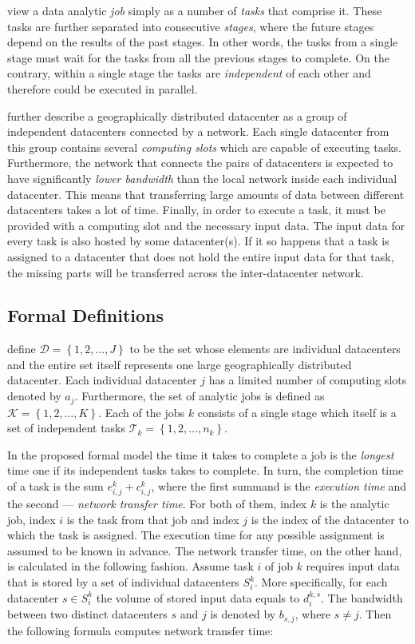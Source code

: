 \citet*{Chen2017} view a data analytic \emph{job} simply as a number of \emph{tasks} that comprise it. These tasks are further separated into consecutive \emph{stages}, where the future stages depend on the results of the past stages. In other words, the tasks from a single stage must wait for the tasks from all the previous stages to complete. On the contrary, within a single stage the tasks are \emph{independent} of each other and therefore could be executed in parallel.

\citet{Chen2017} further describe a geographically distributed datacenter as a group of independent datacenters connected by a network. Each single datacenter from this group contains several \emph{computing slots} which are capable of executing tasks. Furthermore, the network that connects the pairs of datacenters is expected to have significantly \emph{lower bandwidth} than the local network inside each individual datacenter. This means that transferring large amounts of data between different datacenters takes a lot of time. Finally, in order to execute a task, it must be provided with a computing slot and the necessary input data. The input data for every task is also hosted by some datacenter(s). If it so happens that a task is assigned to a datacenter that does not hold the entire input data for that task, the missing parts will be transferred across the inter-datacenter network.

\subsection{Formal Definitions}

\citet*{Chen2017} define \(\mathcal{D} = \left\{1, 2, \dots, J\right\}\) to be the set whose elements are individual datacenters and the entire set itself represents one large geographically distributed datacenter. Each individual datacenter \(j\) has a limited number of computing slots denoted by \(a_j\). Furthermore, the set of analytic jobs is defined as \(\mathcal{K} = \left\{1, 2, \dots, K\right\}\). Each of the jobs \(k\) consists of a single stage which itself is a set of independent tasks \(\mathcal{T}_k=\left\{1, 2, \dots, n_k\right\}\).

In the proposed formal model the time it takes to complete a job is the \emph{longest} time one if its independent tasks takes to complete. In turn, the completion time of a task is the sum \(e^{k}_{i, j} + c^{k}_{i, j}\), where the first summand is the \emph{execution time} and the second --- \emph{network transfer time}. For both of them, index \(k\) is the analytic job, index \(i\) is the task from that job and index \(j\) is the index of the datacenter to which the task is assigned. The execution time for any possible assignment is assumed to be known in advance. The network transfer time, on the other hand, is calculated in the following fashion. Assume task \(i\) of job \(k\) requires input data that is stored by a set of individual datacenters \(S^k_i\). More specifically, for each datacenter \(s\in S^k_i\) the volume of stored input data equals to \(d^{k, s}_i\). The bandwidth between two distinct datacenters \(s\) and \(j\) is denoted by \(b_{s, j}\), where \(s\neq j\). Then the following formula computes network transfer time:


